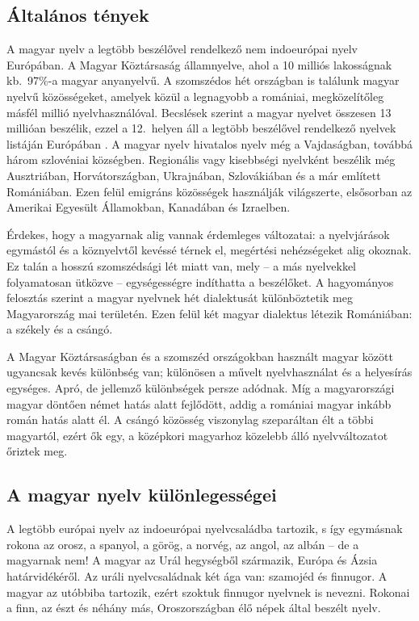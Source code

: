   \begin{multicols}{2}

  \subsection{Általános tények}

  A magyar nyelv a legtöbb beszélővel rendelkező nem indoeurópai nyelv Európában. A Magyar Köztársaság államnyelve, ahol a 10 milliós lakosságnak kb.\ 97\%-a magyar anyanyelvű. A szomszédos hét országban is találunk ma\-gyar nyelvű közösségeket, amelyek közül a legnagyobb a romániai, megközelítőleg másfél millió nyelvhasználóval. Becs\-lé\-sek szerint a magyar nyelvet összesen 13 millióan beszélik, ezzel a 12.~helyen áll a legtöbb beszélővel rendelkező nyelvek listáján Európában \cite{didyouknow1}. A ma\-gyar nyelv hivatalos nyelv még a Vajdaságban, továbbá három szlovéniai községben. Regionális vagy kisebbségi nyelvként beszélik még Ausztriában, Horvátországban, Ukrajnában, Szlovákiában és a már említett Romániában. Ezen felül emig\-ráns közösségek használják világszerte, elsősorban az Amerikai Egyesült Államokban, Kanadában és Izraelben.   

  Érdekes, hogy a magyarnak alig vannak érdemleges változatai: a nyelvjárások egymástól és a köznyelvtől kevéssé térnek el, megértési nehézségeket alig okoznak. Ez talán a hosszú szomszédsági lét miatt van, mely -- a más nyelvekkel fo\-lya\-ma\-to\-san ütközve -- egységességre indíthatta a beszélőket. A hagyományos felosztás szerint a magyar nyelvnek hét dialektusát különböztetik meg Magyarország mai területén. Ezen felül két magyar dialektus létezik Romániában: a székely és a csángó.   

  A Magyar Köztársaságban és a szomszéd országokban használt magyar között ugyancsak kevés különbség van; különösen a művelt nyelvhasználat és a helyesírás egységes. Apró, de jellemző különbségek persze adódnak. Míg a magyarországi magyar döntően német hatás alatt fej\-lő\-dött, addig a romániai magyar inkább román hatás alatt él. A csángó közösség viszonylag szeparáltan élt a többi ma\-gyar\-tól, ezért ők egy, a középkori magyarhoz közelebb álló nyelvváltozatot őriztek meg. 

  \subsection{A magyar nyelv különlegességei}

  A legtöbb európai nyelv az indoeurópai nyelvcsaládba tartozik, s így egymásnak rokona az orosz, a spanyol, a görög, a norvég, az angol, az albán -- de a magyarnak nem! A magyar az Urál hegységből származik, Európa és Ázsia határvidékéről. Az uráli nyelvcsaládnak két ága van: szamojéd és finnugor. A magyar az utóbbiba tartozik, ezért szoktuk finnugor nyelvnek is nevezni. Rokonai a finn, az észt és néhány más, Oroszországban élő népek által beszélt nyelv.


\end{multicols}
